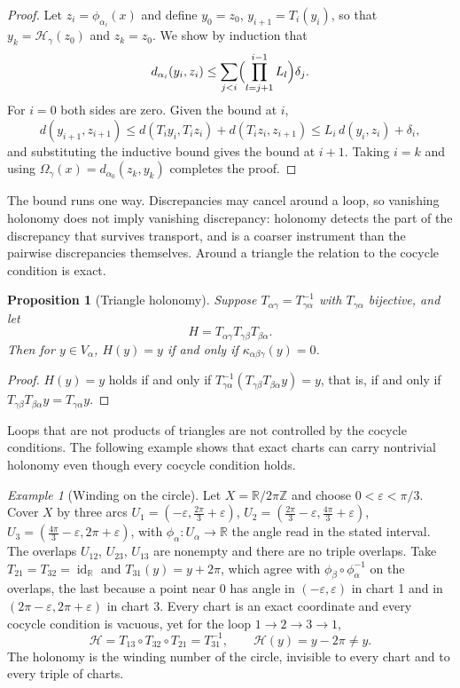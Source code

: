 \documentclass[11pt]{article}
\newtheorem{proposition}{Proposition}
\theoremstyle{remark}
\newtheorem{example}{Example}
\newcommand{\R}{\mathbb{R}}
\newcommand{\id}{\operatorname{id}}
\begin{document}
\begin{proof}
Let $z_i=\phi_{\alpha_i}(x)$ and define $y_0=z_0$, $y_{i+1}=T_i(y_i)$, so that $y_k=\mathcal H_\gamma(z_0)$ and $z_k=z_0$. We show by induction that
\[
d_{\alpha_i}(y_i,z_i)\le\sum_{j<i}\Bigl(\prod_{l=j+1}^{i-1}L_l\Bigr)\delta_j .
\]
For $i=0$ both sides are zero. Given the bound at $i$,
\[
d(y_{i+1},z_{i+1})\le d(T_iy_i,T_iz_i)+d(T_iz_i,z_{i+1})\le L_i\,d(y_i,z_i)+\delta_i,
\]
and substituting the inductive bound gives the bound at $i+1$. Taking $i=k$ and using $\Omega_\gamma(x)=d_{\alpha_0}(z_k,y_k)$ completes the proof.
\end{proof}

The bound runs one way. Discrepancies may cancel around a loop, so vanishing holonomy does not imply vanishing discrepancy: holonomy detects the part of the discrepancy that survives transport, and is a coarser instrument than the pairwise discrepancies themselves. Around a triangle the relation to the cocycle condition is exact.

\begin{proposition}[Triangle holonomy]
Suppose $T_{\alpha\gamma}=T_{\gamma\alpha}^{-1}$ with $T_{\gamma\alpha}$ bijective, and let
\[
H=T_{\alpha\gamma}T_{\gamma\beta}T_{\beta\alpha}.
\]
Then for $y\in V_\alpha$, $H(y)=y$ if and only if $\kappa_{\alpha\beta\gamma}(y)=0$.
\end{proposition}

\begin{proof}
$H(y)=y$ holds if and only if $T_{\gamma\alpha}^{-1}(T_{\gamma\beta}T_{\beta\alpha}y)=y$, that is, if and only if $T_{\gamma\beta}T_{\beta\alpha}y=T_{\gamma\alpha}y$.
\end{proof}

Loops that are not products of triangles are not controlled by the cocycle conditions. The following example shows that exact charts can carry nontrivial holonomy even though every cocycle condition holds.

\begin{example}[Winding on the circle]\label{ex:winding}
Let $X=\R/2\pi\mathbb Z$ and choose $0<\varepsilon<\pi/3$. Cover $X$ by three arcs $U_1=(-\varepsilon,\tfrac{2\pi}{3}+\varepsilon)$, $U_2=(\tfrac{2\pi}{3}-\varepsilon,\tfrac{4\pi}{3}+\varepsilon)$, $U_3=(\tfrac{4\pi}{3}-\varepsilon,2\pi+\varepsilon)$, with $\phi_\alpha:U_\alpha\to\R$ the angle read in the stated interval. The overlaps $U_{12}$, $U_{23}$, $U_{13}$ are nonempty and there are no triple overlaps. Take $T_{21}=T_{32}=\id_\R$ and $T_{31}(y)=y+2\pi$, which agree with $\phi_\beta\circ\phi_\alpha^{-1}$ on the overlaps, the last because a point near $0$ has angle in $(-\varepsilon,\varepsilon)$ in chart 1 and in $(2\pi-\varepsilon,2\pi+\varepsilon)$ in chart 3. Every chart is an exact coordinate and every cocycle condition is vacuous, yet for the loop $1\to2\to3\to1$,
\[
\mathcal H=T_{13}\circ T_{32}\circ T_{21}=T_{31}^{-1},\qquad \mathcal H(y)=y-2\pi\neq y .
\]
The holonomy is the winding number of the circle, invisible to every chart and to every triple of charts.
\end{example}
\end{document}

